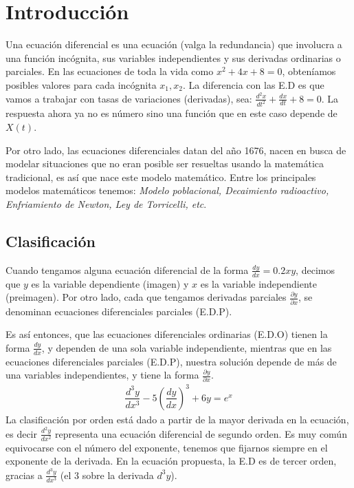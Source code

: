 \chapter{Introducción}

Una ecuación diferencial es una ecuación (valga la redundancia) que involucra a una función incógnita, sus variables independientes y sus derivadas ordinarias o parciales. En las ecuaciones de toda la vida como $x^{2} + 4x + 8 = 0$, obteníamos posibles valores para cada incógnita $x_{1}, x_{2}$. La diferencia con las E.D es que vamos a trabajar con tasas de variaciones (derivadas), sea: $\frac{d^{2}x}{dt^{2}} + \frac{dx}{dt} + 8 = 0$. La respuesta ahora ya no es número sino una función que en este caso depende de $X(t)$.

Por otro lado, las ecuaciones diferenciales datan del año 1676, nacen en busca de modelar situaciones que no eran posible ser resueltas usando la matemática tradicional, es así que nace este modelo matemático. Entre los principales modelos matemáticos tenemos: \textit{Modelo poblacional, Decaimiento radioactivo, Enfriamiento de Newton, Ley de Torricelli, etc}.

\section{Clasificación}
Cuando tengamos alguna ecuación diferencial de la forma $\frac{dy}{dx} = 0.2xy$, decimos que $y$ es la variable dependiente (imagen) y $x$ es la variable independiente (preimagen). Por otro lado, cada que tengamos derivadas parciales $\frac{\partial y}{\partial x}$, se denominan ecuaciones diferenciales parciales (E.D.P).

Es así entonces, que las ecuaciones diferenciales ordinarias (E.D.O) tienen la forma $\frac{dy}{dx}$, y dependen de una sola variable independiente, mientras que en las ecuaciones diferenciales parciales (E.D.P), nuestra solución depende de más de una variables independientes, y tiene la forma $\frac{\partial y}{\partial x}$.
\begin{align*}
  \dfrac{d^{3}y}{dx^{3}} - 5 \left( \dfrac{dy}{dx} \right)^{3} + 6y = e^{x}
\end{align*}
La clasificación por orden está dado a partir de la mayor derivada en la ecuación, es decir $\frac{d^{2}y}{dx^{2}}$ representa una ecuación diferencial de segundo orden. Es muy común equivocarse con el número del exponente, tenemos que fijarnos siempre en el exponente de la derivada. En la ecuación propuesta, la E.D es de tercer orden, gracias a $\frac{d^{3}y}{dx^{3}}$ (el 3 sobre la derivada $d^{3}y$).

